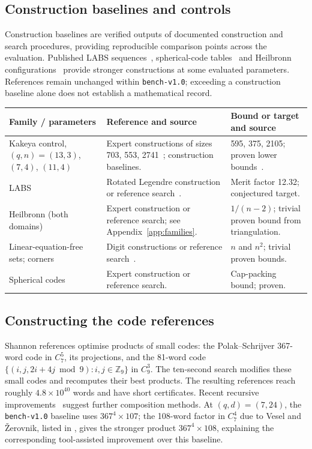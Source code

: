 \subsection{Construction baselines and controls}
Construction baselines are verified outputs of documented construction and search procedures, providing reproducible comparison points across the evaluation. Published LABS sequences~\citep{dimitrov2022sequences}, spherical-code tables~\citep{cohn_spherical_tables} and Heilbronn configurations~\citep{stead_heilbronn_archive} provide stronger constructions at some evaluated parameters. References remain unchanged within \texttt{bench-v1.0}; exceeding a construction baseline alone does not establish a mathematical record.
\begin{center}\small\setlength{\tabcolsep}{4pt}
\begin{tabularx}{\linewidth}{@{}P{.20\linewidth}YY@{}}
\toprule
Family / parameters & Reference and source & Bound or target and source\\
\midrule
Kakeya control, $(q,n)=(13,3)$, $(7,4)$, $(11,4)$ & Expert constructions of sizes 703, 553, 2741~\citep{saraf2008kakeya}; construction baselines. & 595, 375, 2105; proven lower bounds~\citep{bukh2021kakeya}. \\
\addlinespace
LABS & Rotated Legendre construction or reference search~\citep{packebusch2016labs}. & Merit factor 12.32; conjectured target. \\
\addlinespace
Heilbronn (both domains) & Expert construction or reference search; see Appendix~\ref{app:families}. & $1/(n-2)$; trivial proven bound from triangulation. \\
\addlinespace
Linear-equation-free sets; corners & Digit constructions or reference search~\citep{behrend1946,ruzsa1993lineq}. & $n$ and $n^2$; trivial proven bounds. \\
\addlinespace
Spherical codes & Expert construction or reference search. & Cap-packing bound; proven. \\
\bottomrule
\end{tabularx}
\label{tab:construction_refs}
\end{center}
\subsection{Constructing the code references}
Shannon references optimise products of small codes: the Polak--Schrijver 367-word code in $C_7^5$, its projections, and the 81-word code $\{(i,j,2i+4j\bmod9):i,j\in\mathbb Z_9\}$ in $C_9^3$. The ten-second search modifies these small codes and recomputes their best products. The resulting references reach roughly $4.8\times10^{40}$ words and have short certificates. Recent recursive improvements~\citep{tandon2026shannon} suggest further composition methods. At $(q,d)=(7,24)$, the \texttt{bench-v1.0} baseline uses $367^4\times107$; the 108-word factor in $C_7^4$ due to Vesel and \v{Z}erovnik, listed in \citet[Table~1]{polak2019shannon}, gives the stronger product $367^4\times108$, explaining the corresponding tool-assisted improvement over this baseline.

